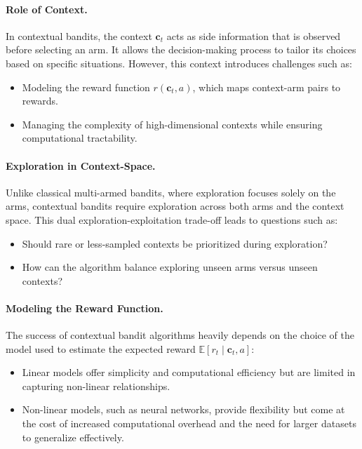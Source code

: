 \paragraph{Role of Context.} 
In contextual bandits, the context $\mathbf{c}_t$ acts as side information that is observed before selecting an arm. It allows the decision-making process to tailor its choices based on specific situations. However, this context introduces challenges such as:
\begin{itemize}
    \item Modeling the reward function $r(\mathbf{c}_t, a)$, which maps context-arm pairs to rewards.
    \item Managing the complexity of high-dimensional contexts while ensuring computational tractability.
\end{itemize}

\paragraph{Exploration in Context-Space.}
Unlike classical multi-armed bandits, where exploration focuses solely on the arms, contextual bandits require exploration across both arms and the context space. This dual exploration-exploitation trade-off leads to questions such as:
\begin{itemize}
    \item Should rare or less-sampled contexts be prioritized during exploration?
    \item How can the algorithm balance exploring unseen arms versus unseen contexts?
\end{itemize}

\paragraph{Modeling the Reward Function.} 
The success of contextual bandit algorithms heavily depends on the choice of the model used to estimate the expected reward $\mathbb{E}[r_t \mid \mathbf{c}_t, a]$:
\begin{itemize}
    \item Linear models offer simplicity and computational efficiency but are limited in capturing non-linear relationships.
    \item Non-linear models, such as neural networks, provide flexibility but come at the cost of increased computational overhead and the need for larger datasets to generalize effectively.
\end{itemize}


